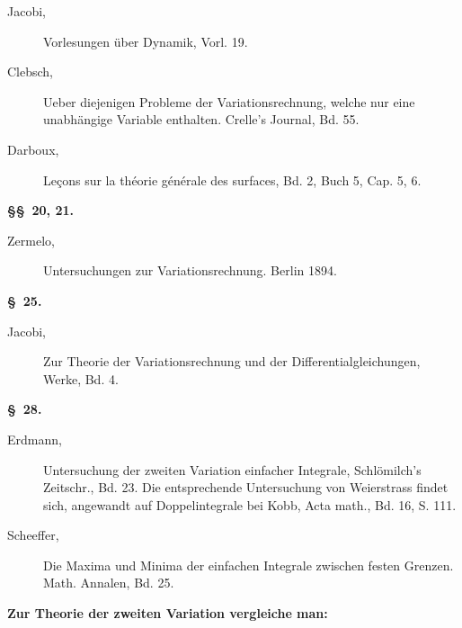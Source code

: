 \documentclass[11pt,a4paper,leqno]{article}
\begin{document}
\begin{description}
\item[Jacobi,] Vorlesungen über Dynamik, Vorl. 19.

\item[Clebsch,] Ueber diejenigen Probleme der Variationsrechnung, welche nur
eine unabhängige Variable enthalten. Crelle's Journal, Bd. 55.

\item[Darboux,] Leçons sur la théorie générale des surfaces, Bd. 2, Buch 5,
Cap. 5, 6.
\end{description}

\begin{center}{\bfseries \S\S~20, 21.}\end{center}

\begin{description}
\item[Zermelo,] Untersuchungen zur Variationsrechnung. Berlin 1894.
\end{description}

\begin{center}{\bfseries \S~25.}\end{center}

\begin{description}
\item[Jacobi,] Zur Theorie der Variationsrechnung und der
Differentialgleichungen, Werke, Bd. 4.
\end{description}

\begin{center}{\bfseries \S~28.}\end{center}

\begin{description}
\item[Erdmann,] Untersuchung der zweiten Variation einfacher Integrale,
Schlömilch's Zeitschr., Bd. 23. Die entsprechende Untersuchung von
Weierstrass findet sich, angewandt auf Doppelintegrale bei Kobb, Acta math.,
Bd. 16, S. 111.

\item[Scheeffer,] Die Maxima und Minima der einfachen Integrale zwischen festen
Grenzen. Math. Annalen, Bd. 25.
\end{description}

\begin{center}{\bfseries Zur Theorie der zweiten Variation vergleiche man:}\end{center}
\end{document}

